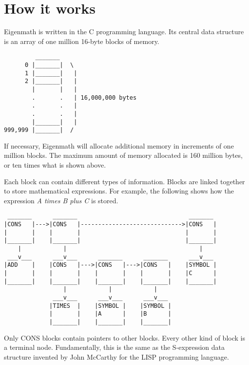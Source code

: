 \chapter{How it works}

Eigenmath is written in the C programming language.
Its central data structure is
an array of one million 16-byte blocks of memory.
\begin{verbatim}
         _______ 
      0 |_______|  \
      1 |_______|   |
      2 |_______|   |
        |       |   |
        .       .   | 16,000,000 bytes
        .       .   |
        .       .   |
        |_______|   |
999,999 |_______|  /
\end{verbatim}
If necessary, Eigenmath will allocate additional memory in increments of one
million blocks.
The maximum amount of memory allocated is 160 million bytes,
or ten times what is shown above.

\newpage

\noindent
Each block can contain different types of information.
Blocks are linked together to store mathematical expressions.
For example, the following shows how the expression
{\it A times B plus C} is stored.
\begin{verbatim}
 _______      _______                                _______
|CONS   |--->|CONS   |----------------------------->|CONS   |
|       |    |       |                              |       |
|_______|    |_______|                              |_______|
    |            |                                      |
 ___v___      ___v___      _______      _______      ___v___
|ADD    |    |CONS   |--->|CONS   |--->|CONS   |    |SYMBOL |
|       |    |       |    |       |    |       |    |C      |
|_______|    |_______|    |_______|    |_______|    |_______|
                 |            |            |
              ___v___      ___v___      ___v___
             |TIMES  |    |SYMBOL |    |SYMBOL |
             |       |    |A      |    |B      |
             |_______|    |_______|    |_______|
\end{verbatim}
Only CONS blocks contain pointers to other blocks.
Every other kind of block is a terminal node.
Fundamentally, this is the same as the S-expression data structure invented by
John McCarthy for the
LISP programming language.
